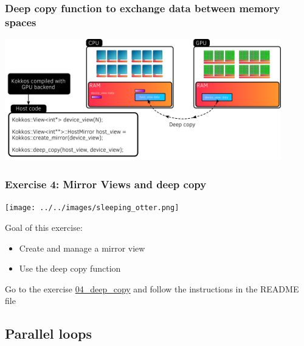 \documentclass[aspectratio=169]{beamer}
\begin{document}
\begin{frame}[fragile]
    \frametitle{Deep copy function to exchange data between memory spaces}

    \begin{center}
        \includegraphics[width=0.9\textwidth]{../../images/device_host_deep_copy.png}
    \end{center}

\end{frame}


\begin{frame}[fragile]
    \frametitle{Exercise 4: Mirror Views and deep copy} 

    \begin{center}
    \texttt{[image: ../../images/sleeping\_otter.png]}
    \end{center}

    Goal of this exercise:

    \begin{itemize}
        \item Create and manage a mirror view
        \item Use the deep copy function
    \end{itemize}

    \begin{block}{}
        Go to the exercise \href{https://github.com/CExA-project/cexa-kokkos-tutorials/tree/main/exercises/04_deep_copy}{04\_deep\_copy} and follow the instructions in the README file
    \end{block}

\end{frame}


\subsection[Data container]{Parallel loops}
\end{document}
